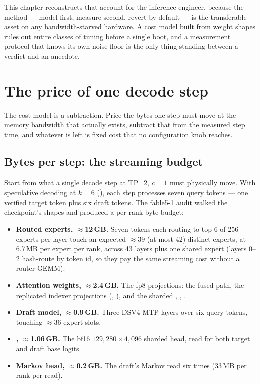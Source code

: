 This chapter reconstructs that account for the inference engineer, because
the method --- model first, measure second, revert by default --- is the
transferable asset on any bandwidth-starved hardware. A cost model built from
weight shapes rules out entire classes of tuning before a single boot, and a
measurement protocol that knows its own noise floor is the only thing
standing between a verdict and an anecdote.

\section{The price of one decode step}
\label{sec:perf-costmodel}

The cost model is a subtraction. Price the bytes one step must move at the
memory bandwidth that actually exists, subtract that from the measured step
time, and whatever is left is fixed cost that no configuration knob reaches.

\subsection{Bytes per step: the streaming budget}

Start from what a single decode step at TP=2, $c=1$ must physically move. With
speculative decoding at $k=6$ (), each step processes seven
query tokens --- one verified target token plus six draft tokens. The fable5-1
audit walked the checkpoint's shapes and produced a per-rank byte budget:

\begin{itemize}
  \item \textbf{Routed experts, $\approx$12\,GB.} Seven tokens each routing to
    top-6 of 256 experts per layer touch an expected $\approx$39 (at most 42)
    distinct experts, at 6.7\,MB per expert per rank, across 43 layers plus one
    shared expert (layers 0--2 hash-route by token id, so they pay the same
    streaming cost without a router GEMM).
  \item \textbf{Attention weights, $\approx$2.4\,GB.} The fp8 projections:
    the fused  path, the replicated indexer projections
    (, ), and the sharded ,
    , .
  \item \textbf{Draft model, $\approx$0.9\,GB.} Three DSV4 MTP layers over six
    query tokens, touching $\approx$36 expert slots.
  \item \textbf{, $\approx$1.06\,GB.} The bf16
    $129{,}280 \times 4{,}096$ sharded head, read for both target and draft
    base logits.
  \item \textbf{Markov head, $\approx$0.2\,GB.} The draft's Markov 
    read six times (33\,MB per rank per read).
\end{itemize}

